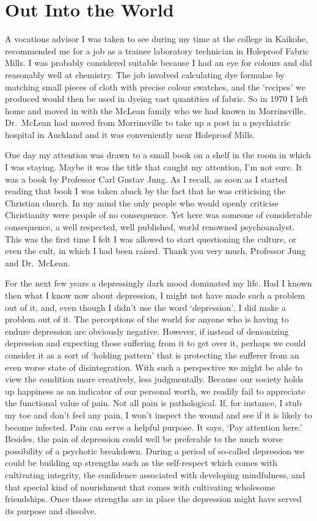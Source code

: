 \chapter{Out Into the World}

A vocations advisor I was taken to see during my time at the college in
Kaikohe, recommended me for a job as a trainee laboratory technician in
Holeproof Fabric Mills. I was probably considered suitable because I had
an eye for colours and did reasonably well at chemistry. The job
involved calculating dye formulae by matching small pieces of cloth with
precise colour swatches, and the `recipes' we produced would then be
used in dyeing vast quantities of fabric. So in 1970 I left home and
moved in with the McLean family who we had known in Morrinsville.
Dr.~McLean had moved from Morrinsville to take up a post in a psychiatric
hospital in Auckland and it was conveniently near Holeproof Mills.

One day my attention was drawn to a small book on a shelf in the room in
which I was staying. Maybe it was the title that caught my attention,
I'm not sure. It was a book by Professor Carl Gustav Jung. As I recall,
as soon as I started reading that book I was taken aback by the fact
that he was criticising the Christian church. In my mind the only people
who would openly criticise Christianity were people of no consequence.
Yet here was someone of considerable consequence, a well respected, well
published, world renowned psychoanalyst. This was the first time I felt
I was allowed to start questioning the culture, or even the cult, in
which I had been raised. Thank you very much, Professor Jung and Dr.~McLean.

For the next few years a depressingly dark mood dominated my life. Had I
known then what I know now about depression, I might not have made such
a problem out of it, and, even though I didn't use the word
`depression', I did make a problem out of it. The perceptions of the
world for anyone who is having to endure depression are obviously
negative. However, if instead of demonizing depression and expecting
those suffering from it to get over it, perhaps we could consider it as
a sort of `holding pattern' that is protecting the sufferer from an even
worse state of disintegration. With such a perspective we might be able
to view the condition more creatively, less judgmentally. Because our
society holds up happiness as an indicator of our personal worth, we
readily fail to appreciate the functional value of pain. Not all pain is
pathological. If, for instance, I stub my toe and don't feel any pain, I
won't inspect the wound and see if it is likely to become infected. Pain
can serve a helpful purpose. It says, `Pay attention here.' Besides, the
pain of depression could well be preferable to the much worse
possibility of a psychotic breakdown. During a period of so-called
depression we could be building up strengths such as the self-respect
which comes with cultivating integrity, the confidence associated with
developing mindfulness, and that special kind of nourishment that comes
with cultivating wholesome friendships. Once those strengths are in
place the depression might have served its purpose and dissolve.

